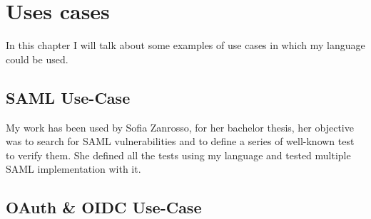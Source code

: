 \chapter{Uses cases}
In this chapter I will talk about some examples of use cases in which my language could be used.

\section{SAML Use-Case}
My work has been used by Sofia Zanrosso, for her bachelor thesis, her objective was to search for SAML vulnerabilities and to define a series of well-known test to verify them.
She defined all the tests using my language and tested multiple SAML implementation with it.

\section{OAuth \& OIDC Use-Case}

